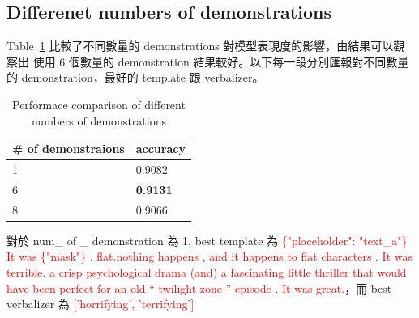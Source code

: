 \documentclass[a4paper,12pt]{article}   %
\newcommand{\xq}[1]{\textcolor{red}{#1}}
\begin{document}
\vspace{-2mm}
\subsection{Differenet numbers of demonstrations}

Table\ \ref{table:different_demonstrations} 比較了不同數量的 demonstrations 對模型表現度的影響，由結果可以觀察出 使用 6 個數量的 demonstration 結果較好。以下每一段分別匯報對不同數量的 demonstration，最好的 template 跟 verbalizer。


\begin{table}[htb]
	\centering
	\normalsize
    \caption{Performace comparison of different numbers of demonstrations}
    \vspace{0.15\baselineskip}
    \begin{tabularx}{1\textwidth}{@{}XX@{}}
		\toprule
		\textbf{\# of demonstraions} & \textbf{accuracy} \\
		\midrule
		1        &  0.9082  \\ 
		6        &  \textbf{0.9131}  \\
		8       &   0.9066  \\ 
		\bottomrule
	\end{tabularx}
	\label{table:different_demonstrations}
    \vspace{0.15\baselineskip}
\end{table}

對於 num\_ of \_ demonstration 為 1, best template 為 \xq{\{"placeholder": "text\_a"\} It was \{"mask"\} . flat.nothing happens , and it happens to flat characters . It was terrible. a crisp psychological drama (and) a fascinating little thriller that would have been perfect for an old `` twilight zone '' episode . It was great.}，而 best verbalizer 為 \xq{['horrifying', 'terrifying']} 
\end{document}
